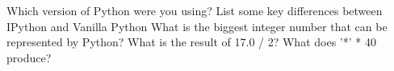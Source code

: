 \documentclass[a4paper,10pt]{book}
\begin{document}
Which version of Python were you using? 
List some key differences between IPython and Vanilla Python
What is the biggest integer number that can be represented by Python?
What is the result of 17.0 / 2?
What does '*' * 40 produce?
 
\end{document}
